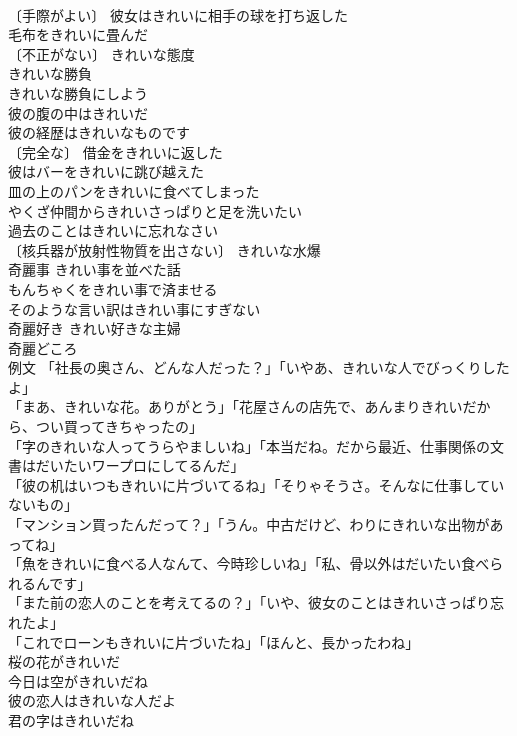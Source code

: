 \documentclass[8pt]{extreport}
\begin{document}
\begin{CJK}{UTF8}{min}
\\	〔手際がよい〕 彼女はきれいに相手の球を打ち返した 
\\	毛布をきれいに畳んだ 
\\	〔不正がない〕 きれいな態度 
\\	きれいな勝負 
\\	きれいな勝負にしよう 
\\	彼の腹の中はきれいだ 
\\	彼の経歴はきれいなものです 
\\	〔完全な〕 借金をきれいに返した 
\\	彼はバーをきれいに跳び越えた 
\\	皿の上のパンをきれいに食べてしまった 
\\	やくざ仲間からきれいさっぱりと足を洗いたい 
\\	過去のことはきれいに忘れなさい 
\\	〔核兵器が放射性物質を出さない〕 きれいな水爆 
\\	奇麗事 きれい事を並べた話 
\\	もんちゃくをきれい事で済ませる 
\\	そのような言い訳はきれい事にすぎない 
\\	奇麗好き きれい好きな主婦 
\\	奇麗どころ 
\\	例文 「社長の奥さん、どんな人だった？」「いやあ、きれいな人でびっくりしたよ」 
\\	「まあ、きれいな花。ありがとう」「花屋さんの店先で、あんまりきれいだから、つい買ってきちゃったの」 
\\	「字のきれいな人ってうらやましいね」「本当だね。だから最近、仕事関係の文書はだいたいワープロにしてるんだ」 
\\	「彼の机はいつもきれいに片づいてるね」「そりゃそうさ。そんなに仕事していないもの」 
\\	「マンション買ったんだって？」「うん。中古だけど、わりにきれいな出物があってね」 
\\	「魚をきれいに食べる人なんて、今時珍しいね」「私、骨以外はだいたい食べられるんです」 
\\	「また前の恋人のことを考えてるの？」「いや、彼女のことはきれいさっぱり忘れたよ」 
\\	「これでローンもきれいに片づいたね」「ほんと、長かったわね」 
\\	桜の花がきれいだ 
\\	今日は空がきれいだね 
\\	彼の恋人はきれいな人だよ 
\\	君の字はきれいだね 

\end{CJK}
\end{document}
